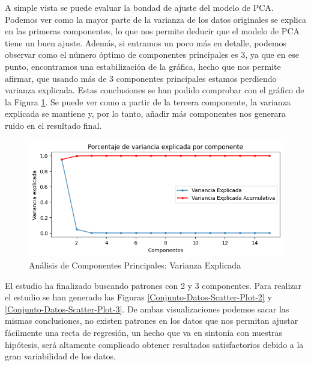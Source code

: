 A simple vista se puede evaluar la bondad de ajuste del modelo de PCA. Podemos ver como la mayor parte de la varianza de los datos originales se explica en las primeras componentes, lo que nos permite deducir que el modelo de PCA tiene un buen ajuste. Además, si entramos un poco más en detalle, podemos observar como el número óptimo de componentes principales es 3, ya que en ese punto, encontramos una estabilización de la gráfica, hecho que nos permite afirmar, que usando más de 3 componentes principales estamos perdiendo varianza explicada. Estas conclusiones se han podido comprobar con el gráfico de la Figura \ref{Conjunto-Datos-Varianza-Explicada}. Se puede ver como a partir de la tercera componente, la varianza explicada se mantiene y, por lo tanto, añadir más componentes nos generara ruido en el resultado final.

\begin{figure}[H]
    \centering
    \includegraphics[width=\figsize]{images/varianzaExplicada.png}
    \caption{Análisis de Componentes Principales: Varianza Explicada}
    \label{Conjunto-Datos-Varianza-Explicada}
\end{figure}

El estudio ha finalizado buscando patrones con 2 y 3 componentes. Para realizar el estudio se han generado las Figuras \ref{Conjunto-Datos-Scatter-Plot-2} y \ref{Conjunto-Datos-Scatter-Plot-3}. De ambas visualizaciones podemos sacar las mismas conclusiones, no existen patrones en los datos que nos permitan ajustar fácilmente una recta de regresión, un hecho que va en sintonía con nuestras hipótesis, será altamente complicado obtener resultados satisfactorios debido a la gran variabilidad de los datos.

